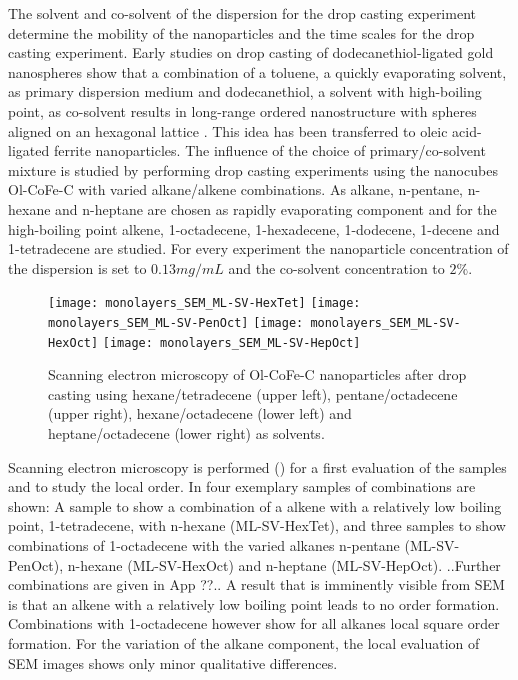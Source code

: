 \documentclass[\main/dresen_thesis.tex]{subfiles}
\begin{document}
  The solvent and co-solvent of the dispersion for the drop casting experiment determine the mobility of the nanoparticles and the time scales for the drop casting experiment.
  Early studies on drop casting of dodecanethiol-ligated gold nanospheres show that a combination of a toluene, a quickly evaporating solvent, as primary dispersion medium and dodecanethiol, a solvent with high-boiling point, as co-solvent results in long-range ordered nanostructure with spheres aligned on an hexagonal lattice \cite{Bigioni_2006_Kinet}.
  This idea has been transferred to oleic acid-ligated ferrite nanoparticles.
  The influence of the choice of primary/co-solvent mixture is studied by performing drop casting experiments using the nanocubes Ol-CoFe-C with varied alkane/alkene combinations.
  As alkane, n-pentane, n-hexane and n-heptane are chosen as rapidly evaporating component and for the high-boiling point alkene, 1-octadecene, 1-hexadecene, 1-dodecene, 1-decene and 1-tetradecene are studied.
  For every experiment the nanoparticle concentration of the dispersion is set to $0.13 \unit{mg/mL}$ and the co-solvent concentration to $2\unit{\%}$.

  \begin{figure}[tb]
    \centering
    \texttt{[image: monolayers\_SEM\_ML-SV-HexTet]}
    \texttt{[image: monolayers\_SEM\_ML-SV-PenOct]}
    \texttt{[image: monolayers\_SEM\_ML-SV-HexOct]}
    \texttt{[image: monolayers\_SEM\_ML-SV-HepOct]}
    \caption{\label{fig:monolayers:preparation:solventVariation:sem}Scanning electron microscopy of Ol-CoFe-C nanoparticles after drop casting using hexane/tetradecene (upper left),  pentane/octadecene (upper right), hexane/octadecene (lower left) and heptane/octadecene (lower right) as solvents.}
  \end{figure}

  Scanning electron microscopy is performed () for a first evaluation of the samples and to study the local order.
  In  four exemplary samples of combinations are shown: A sample to show a combination of a alkene with a relatively low boiling point, 1-tetradecene, with n-hexane (ML-SV-HexTet), and three samples to show combinations of 1-octadecene with the varied alkanes n-pentane (ML-SV-PenOct), n-hexane (ML-SV-HexOct) and n-heptane (ML-SV-HepOct).
  ..Further combinations are given in App ??..
  A result that is imminently visible from SEM is that an alkene with a relatively low boiling point leads to no order formation. 
  Combinations with 1-octadecene however show for all alkanes local square order formation.
  For the variation of the alkane component, the local evaluation of SEM images shows only minor qualitative differences.
\end{document}
